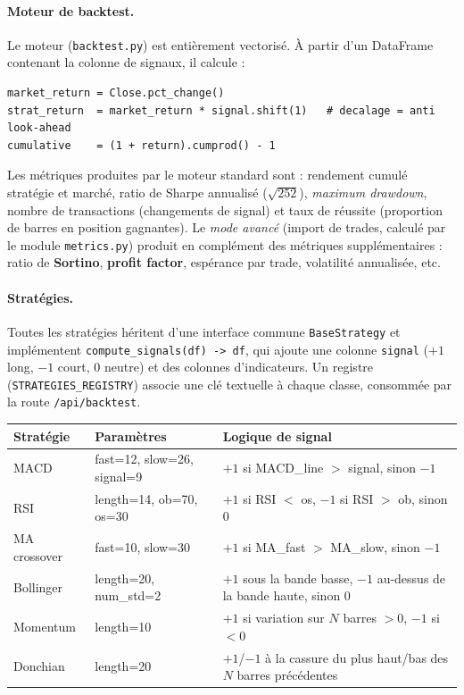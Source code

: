 \documentclass[11pt,a4paper]{article}
\newcommand{\code}[1]{\texttt{#1}}
\begin{document}
\paragraph{Moteur de backtest.}
Le moteur (\code{backtest.py}) est entièrement vectorisé. À partir d'un
DataFrame contenant la colonne de signaux, il calcule :
\begin{lstlisting}[style=py]
market_return = Close.pct_change()
strat_return  = market_return * signal.shift(1)   # decalage = anti look-ahead
cumulative    = (1 + return).cumprod() - 1
\end{lstlisting}
Les métriques produites par le moteur standard sont : rendement cumulé stratégie
et marché, ratio de Sharpe annualisé ($\sqrt{252}$), \emph{maximum drawdown},
nombre de transactions (changements de signal) et taux de réussite (proportion de
barres en position gagnantes). Le \emph{mode avancé} (import de trades, calculé
par le module \code{metrics.py}) produit en complément des métriques
supplémentaires : ratio de \textbf{Sortino}, \textbf{profit factor}, espérance par
trade, volatilité annualisée, etc.

\paragraph{Stratégies.}
Toutes les stratégies héritent d'une interface commune \code{BaseStrategy} et
implémentent \code{compute\_signals(df) -> df}, qui ajoute une colonne
\code{signal} ($+1$ long, $-1$ court, $0$ neutre) et des colonnes d'indicateurs.
Un registre (\code{STRATEGIES\_REGISTRY}) associe une clé textuelle à chaque
classe, consommée par la route \code{/api/backtest}.
\begin{center}
\begin{tabular}{@{}ll p{6.6cm}@{}}
\toprule
\textbf{Stratégie} & \textbf{Paramètres} & \textbf{Logique de signal} \\
\midrule
MACD          & fast=12, slow=26, signal=9 & $+1$ si MACD\_line $>$ signal, sinon $-1$ \\
RSI           & length=14, ob=70, os=30    & $+1$ si RSI $<$ os, $-1$ si RSI $>$ ob, sinon $0$ \\
MA crossover  & fast=10, slow=30           & $+1$ si MA\_fast $>$ MA\_slow, sinon $-1$ \\
Bollinger     & length=20, num\_std=2      & $+1$ sous la bande basse, $-1$ au-dessus de la bande haute, sinon $0$ \\
Momentum      & length=10                  & $+1$ si variation sur $N$ barres $>0$, $-1$ si $<0$ \\
Donchian      & length=20                  & $+1$/$-1$ à la cassure du plus haut/bas des $N$ barres précédentes \\
\bottomrule
\end{tabular}
\end{center}
\end{document}
